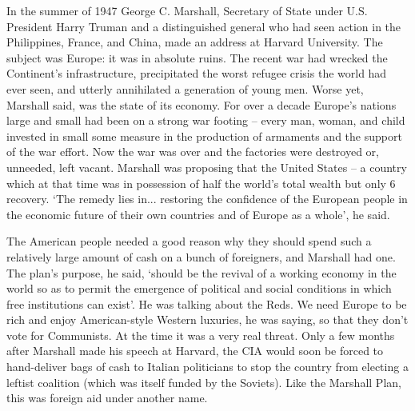   In the summer of 1947 George C. Marshall, Secretary of State under U.S.
   President Harry Truman and a distinguished general who had seen action
   in the Philippines, France, and China, made an address at Harvard
   University. The subject was Europe: it was in absolute ruins. The
   recent war had wrecked the Continent's infrastructure, precipitated the
   worst refugee crisis the world had ever seen, and utterly annihilated a
   generation of young men. Worse yet, Marshall said, was the state of its
   economy. For over a decade Europe's nations large and small had been on
   a strong war footing -- every man, woman, and child invested in small
   some measure in the production of armaments and the support of the war
   effort. Now the war was over and the factories were destroyed or,
   unneeded, left vacant. Marshall was proposing that the United States --
   a country which at that time was in possession of half the world's
   total wealth but only 6%
   recovery. `The remedy lies in... restoring the confidence of the
   European people in the economic future of their own countries and of
   Europe as a whole', he said.

   The American people needed a good reason why they should spend such a
   relatively large amount of cash on a bunch of foreigners, and Marshall
   had one. The plan's purpose, he said, `should be the revival of a
   working economy in the world so as to permit the emergence of political
   and social conditions in which free institutions can exist'. He was
   talking about the Reds. We need Europe to be rich and enjoy
   American-style Western luxuries, he was saying, so that they don't vote
   for Communists. At the time it was a very real threat. Only a few
   months after Marshall made his speech at Harvard, the CIA would soon be
   forced to hand-deliver bags of cash to Italian politicians to stop the
   country from electing a leftist coalition (which was itself funded by
   the Soviets). Like the Marshall Plan, this was foreign aid under
   another name.

